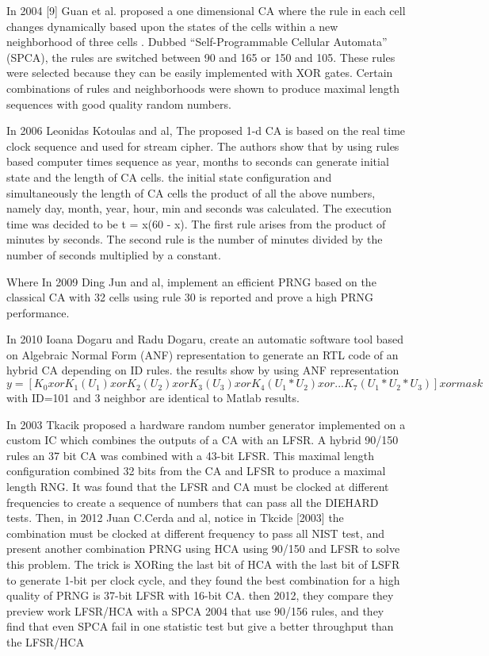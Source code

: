 %

In 2004 [9] Guan et al. proposed a one dimensional CA where the rule in each cell changes dynamically based upon the states of the cells within a new neighborhood of three cells . Dubbed “Self-Programmable Cellular Automata” (SPCA), the rules are switched between 90 and 165 or 150 and 105. These rules were selected because they can be easily implemented with XOR gates. Certain combinations of rules and neighborhoods were shown to produce maximal length sequences with good quality random numbers.

In 2006 Leonidas Kotoulas and al, The proposed 1-d CA is based on the real time clock sequence and used for stream cipher. The authors show that by using rules based computer times sequence as year, months to seconds can generate initial state and the length of CA cells. the initial state configuration and simultaneously the length of CA cells the product of all the above numbers, namely day, month, year, hour, min and seconds was calculated. The execution time was decided to be t = x(60 - x). The first rule arises from the product of minutes by seconds. The second rule is the number of minutes divided by the number of seconds multiplied by a constant.

Where In 2009 Ding Jun and al, implement an efficient PRNG based on the classical CA with 32 cells using rule 30 is reported and prove a high PRNG performance. 

In 2010 Ioana Dogaru and Radu Dogaru, create an automatic software tool based on Algebraic Normal Form (ANF) representation to generate an RTL code of an hybrid CA depending on ID rules. the results show by using ANF representation  $y = [K_{0} xor K_{1}(U_{1}) xor K_{2}(U_{2}) xor K_{3}(U_{3}) xor K_{4}(U_{1}*U_{2}) xor ... K_{7}(U_{1}*U_{2}*U_{3})] xor mask$ with ID=101 and 3 neighbor are identical to Matlab results.

In 2003 Tkacik proposed a hardware random number generator implemented on a custom IC which combines the outputs of a CA with an LFSR. A hybrid 90/150 rules an 37 bit CA was combined with a 43-bit LFSR. This maximal length configuration combined 32 bits from the CA and LFSR to produce a maximal length RNG. It was found that the LFSR and CA must be clocked at different frequencies to create a sequence of numbers that can pass all the DIEHARD tests. Then, in 2012 Juan C.Cerda and al, notice in Tkcide [2003] the combination must be clocked at different frequency to pass all NIST test, and present another combination PRNG using HCA using 90/150 and LFSR to solve this problem. The trick is XORing the last bit of HCA with the last bit of LSFR to generate 1-bit per clock cycle, and they found the best combination for a high quality of PRNG is 37-bit LFSR with 16-bit CA. then 2012, they compare they preview work LFSR/HCA with a SPCA 2004 that use 90/156 rules, and they find that even SPCA fail in one statistic test but give a better throughput than the LFSR/HCA

